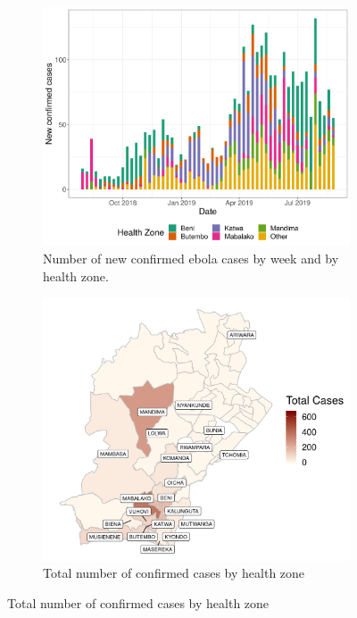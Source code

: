 \documentclass[12pt]{article}
\begin{document}
\begin{figure}[h!]
\begin{subfigure}{0.48\textwidth}
  \centering

  \includegraphics[width=\textwidth]{../output/epi_curve.png}
  \caption{Number of new confirmed ebola cases by week and by health zone.}
  \label{fig:epi_curve}
\end{subfigure}
\begin{subfigure}{0.48\textwidth}
  \centering
  \includegraphics[width=\textwidth]{../output/tot_map.png}
  \caption{Total number of confirmed cases by health zone}
  \label{fig:tot_map}
\end{subfigure}


\end{figure}
\end{document}
